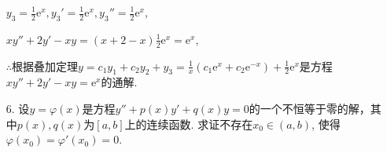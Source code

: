 \documentclass[12pt,UTF8,fleqn]{ctexart}
\newcommand{\md}[1]{\mathrm d#1}
\newcommand{\me}[0]{\mathrm e}
\begin{document}
\begin{enumerate}
$y_3=\frac12\me^x,y_3'=\frac12\me^x,y_3''=\frac12\me^x$,

$xy''+2y'-xy=(x+2-x)\frac12\me^x=\me^x$,

$\therefore$根据叠加定理$y=c_1y_1+c_2y_2+y_3=\frac1x(c_1\me^x+c_2\me^{-x})+\frac12\me^x$是方程$xy''+2y'-xy=\me^x$的通解.

%
%
%
%
%
%
%
%
%
%
%
%
%
%
%
%
%
%
%

\item[6.]设$y=\varphi(x)$是方程$y''+p(x)y'+q(x)y=0$的一个不恒等于零的解，其中$p(x),q(x)$为$[a,b]$上的连续函数. 求证不存在$x_0\in(a,b)$, 使得$\varphi(x_0)=\varphi'(x_0)=0$.


\end{enumerate}
\end{document}
